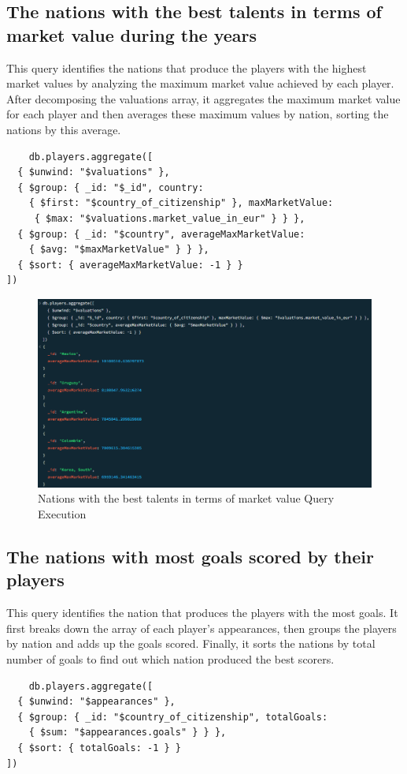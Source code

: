 \documentclass{Configuration_Files/PoliMi3i_thesis}
\begin{document}
\subsection{The nations with the best talents in terms of market value during the years}
This query identifies the nations that produce the players with the highest market values by analyzing the maximum market value achieved by each player. After decomposing the valuations array, it aggregates the maximum market value for each player and then averages these maximum values by nation, sorting the nations by this average.
\begin{verbatim}
    db.players.aggregate([
  { $unwind: "$valuations" },
  { $group: { _id: "$_id", country: 
    { $first: "$country_of_citizenship" }, maxMarketValue:
     { $max: "$valuations.market_value_in_eur" } } },
  { $group: { _id: "$country", averageMaxMarketValue: 
    { $avg: "$maxMarketValue" } } },
  { $sort: { averageMaxMarketValue: -1 } }
])
\end{verbatim}
\begin{figure}[htbp]
    \centering
    \includegraphics[scale=0.72]{Images/Queries/Nation_talents_market_value/ntmv.png}
    \caption{Nations with the best talents in terms of market value Query Execution}
\end{figure}

\subsection{The nations with most goals scored by their players}
This query identifies the nation that produces the players with the most goals. It first breaks down the array of each player's appearances, then groups the players by nation and adds up the goals scored. Finally, it sorts the nations by total number of goals to find out which nation produced the best scorers.
\begin{verbatim}
    db.players.aggregate([
  { $unwind: "$appearances" },
  { $group: { _id: "$country_of_citizenship", totalGoals: 
    { $sum: "$appearances.goals" } } },
  { $sort: { totalGoals: -1 } }
])
\end{verbatim}
\end{document}
